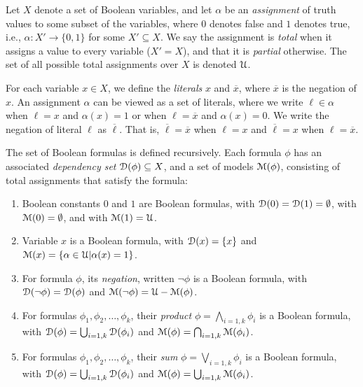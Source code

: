 \documentclass[letterpaper,USenglish,cleveref, autoref, thm-restate]{lipics-v2021}
\newcommand{\boolnot}{\neg}
\newcommand{\obar}[1]{\overline{#1}}
\newcommand{\lit}{\ell}
\newcommand{\varset}{X}
\newcommand{\dependencyset}{{\cal D}}
\newcommand{\assign}{\alpha}
\newcommand{\uassign}{{\cal U}}
\newcommand{\modelset}{{\cal M}}
\begin{document}
  Let $\varset$ denote a set of Boolean variables, and let $\assign$
  be an {\em assignment} of truth values to some subset of the
  variables, where $0$ denotes false and $1$ denotes true, i.e.,
  $\assign \colon \varset' \rightarrow \{0,1\}$ for some $\varset'
  \subseteq \varset$.  We say the assignment is {\em total} when it
  assigns a value to every variable ($\varset' = \varset$), and that
  it is {\em partial} otherwise.
  The set of all possible total assignments over
  $\varset$ is denoted $\uassign$.

For each variable $x \in \varset$,
  we define the {\em literals} $x$ and $\obar{x}$, where $\obar{x}$ is the
  negation of $x$. An
  assignment $\assign$ can be viewed as a set of literals, where
  we write $\lit \in \assign$ when $\lit = x$ and $\assign(x) = 1$ or when
  $\lit = \obar{x}$ and $\assign(x) = 0$.  We write the negation of literal $\lit$ as $\obar{\lit}$.  That is, $\obar{\lit} = \obar{x}$ when $\lit = x$ and
$\obar{\lit} = x$ when $\lit = \obar{x}$.


\begin{definition}
  The set of Boolean formulas is defined recursively.  Each
  formula $\phi$ has an associated {\em dependency set}
  $\dependencyset(\phi)  \subseteq \varset$, and a set of models $\modelset(\phi)$,
  consisting of total assignments that satisfy the formula:
  \begin{enumerate}
  \item Boolean constants $0$ and $1$ are Boolean formulas,
    with $\dependencyset(0) = \dependencyset(1) = \emptyset$, with $\modelset(0) = \emptyset$, and with $\modelset(1) = \uassign$.
  \item Variable $x$ is a Boolean formula, with $\dependencyset(x) = \{x\}$
    and $\modelset(x) = \{\assign \in \uassign | \assign(x)=1\}$.
  \item For formula $\phi$, its {\em negation}, written $\boolnot \phi$ is a Boolean formula,
    with $\dependencyset(\boolnot \phi) = \dependencyset(\phi)$ and $\modelset(\boolnot \phi) = \uassign - \modelset(\phi)$.
  \item For formulas $\phi_1, \phi_2, \ldots, \phi_k$, their {\em product} $\phi = \bigwedge_{i=1,k} \phi_i$ is a Boolean formula, with
      $\dependencyset(\phi) = \bigcup_{i=1,k} \dependencyset(\phi_i)$ and
      $\modelset(\phi) = \bigcap_{i=1,k} \modelset(\phi_i)$.
  \item For formulas $\phi_1, \phi_2, \ldots, \phi_k$, their {\em sum} $\phi = \bigvee_{i=1,k} \phi_i$ is a Boolean formula, with
      $\dependencyset(\phi) = \bigcup_{i=1,k} \dependencyset(\phi_i)$ and
      $\modelset(\phi) = \bigcup_{i=1,k} \modelset(\phi_i)$.
  \end{enumerate}
\label{def:boolean}
\end{definition}
\end{document}
